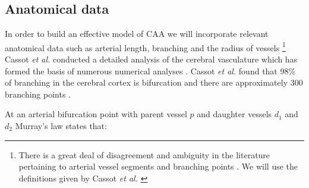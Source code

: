 \documentclass[12pt]{article} %
\theoremstyle{definition}
\begin{document}


%







\subsection{Anatomical data}\label{sec:ana}

In order to build an effective model of CAA we will incorporate relevant anatomical data such as arterial length, branching and the radius of vessels \footnote{  There is  a great deal of disagreement and ambiguity in the literature pertaining to arterial vessel segments and branching points \cite{Zamir}.  We will use the definitions given by Cassot \emph{et al.} \cite{Cassot}} 
Cassot \emph{et al.} conducted a detailed analysis of the cerebral vasculature which has formed the basis of numerous numerical analyses \cite{grinberg,francis,risser}. Cassot \emph{et al.} found that 98\% of branching in the cerebral cortex is bifurcation and there are approximately  300 branching points \cite{Cassot}. 


At an arterial bifurcation point with parent vessel $p$ and daughter vessels $d_{1}$ and $d_2$ Murray's law \cite{Murray} states that:
\end{document}
